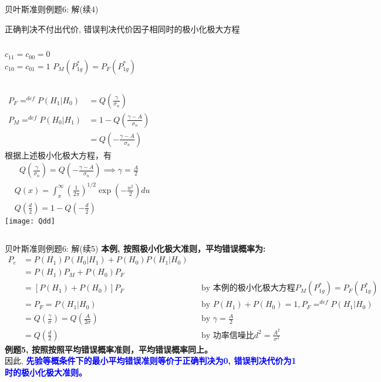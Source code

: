 \begin{frame}[shrink]{贝叶斯准则例题6: 解(续4)}
\begin{block}{正确判决不付出代价, 错误判决代价因子相同时的极小化极大方程}
	\begin{columns}
		$c_{11}=c_{00}=0$\\
		$c_{10}=c_{01}=1$
		$P_M(P_{1g}^\ast)=P_F(P_{1g}^\ast)$ 
	\end{columns}
\end{block}
\begin{columns}[T]
	\column{0.5\textwidth}
	\small
	\begin{align*}
	P_F\mathop{=}^{def}P(H_1|H_0)&=Q\left(\frac{\gamma}{\sigma_n}\right)\\
	P_M\mathop{=}^{def}P(H_0|H_1)&=1-Q\left(\frac{\gamma-A}{\sigma_n}\right)\\
	&=Q\left(-\frac{\gamma-A}{\sigma_n}\right)
	\end{align*}
	根据上述极小化极大方程，有
	\begin{align*}
	Q\left(\frac{\gamma}{\sigma_n}\right)=Q\left(-\frac{\gamma-A}{\sigma_n}\right)\implies \gamma=\frac{A}{2}
	\end{align*}
	\column{0.5\textwidth}
	\small
	\begin{align*}
	&Q(x)=\int_{x}^{\infty}\left(\frac{1}{2\pi}\right)^{1/2}\exp\left(-\frac{u^2}{2}\right)du\\
	&Q\left(\frac{d}{2}\right) = 1-Q\left(-\frac{d}{2}\right)
	\end{align*}
	\centering
	\texttt{[image: Qdd]}
\end{columns}
\end{frame}

\begin{frame}[shrink]{贝叶斯准则例题6: 解(续5)}
\textbf{本例, 按照极小化极大准则，平均错误概率为:}
\begin{align*}
P_e&=P(H_1)P(H_0|H_1)+P(H_0)P(H_1|H_0)\\
&=P(H_1)P_M+P(H_0)P_F\\
&=[P(H_1)+P(H_0)]P_F &&\text{by 本例的极小化极大方程}P_M(P_{1g}^\ast)=P_F(P_{1g}^\ast)\\
&=P_F=P(H_1|H_0) &&\text{by }P(H_1)+P(H_0)=1, P_F\mathop{=}^{def}P(H_1|H_0)\\
&=Q(\frac{\gamma}{\sigma})=Q\left(\frac{A}{2\sigma}\right) && \text{by }\gamma=\frac{A}{2}\\
&=Q(\frac{d}{2}) &&\text{by 功率信噪比}d^2=\frac{A^2}{\sigma^2}
\end{align*}
\textbf{例题5, 按照按照平均错误概率准则，平均错误概率同上。}\\
因此, \textbf{\textcolor{blue}{先验等概条件下的最小平均错误准则等价于正确判决为0, 错误判决代价为1时的极小化极大准则。}}
\end{frame}

